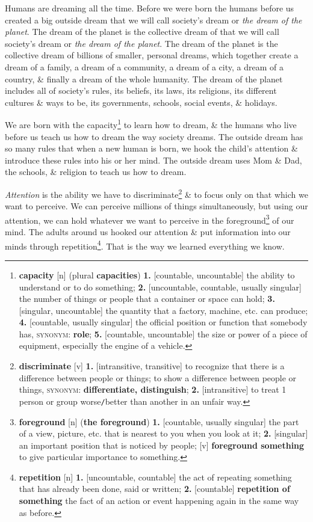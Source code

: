 \documentclass[oneside]{book}
\numberwithin{equation}{section}
\begin{document}
Humans are dreaming all the time. Before we were born the humans before us created a big outside dream that we will call society's dream or \textit{the dream of the planet}. The dream of the planet is the collective dream of that we will call society's dream or \textit{the dream of the planet}. The dream of the planet is the collective dream of billions of smaller, personal dreams, which together create a dream of a family, a dream of a community, a dream of a city, a dream of a country, \& finally a dream of the whole humanity. The dream of the planet includes all of society's rules, its beliefs, its laws, its religions, its different cultures \& ways to be, its governments, schools, social events, \& holidays.

We are born with the capacity\footnote{\textbf{capacity} [n] (plural \textbf{capacities}) \textbf{1.} [countable, uncountable] the ability to understand or to do something; \textbf{2.} [uncountable, countable, usually singular] the number of things or people that a container or space can hold; \textbf{3.} [singular, uncountable] the quantity that a factory, machine, etc. can produce; \textbf{4.} [countable, usually singular] the official position or function that somebody has, \textsc{synonym}: \textbf{role}; \textbf{5.} [countable, uncountable] the size or power of a piece of equipment, especially the engine of a vehicle.} to learn how to dream, \& the humans who live before us teach us how to dream the way society dreams. The outside dream has so many rules that when a new human is born, we hook the child's attention \& introduce these rules into his or her mind. The outside dream uses Mom \& Dad, the schools, \& religion to teach us how to dream.

\textit{Attention} is the ability we have to discriminate\footnote{\textbf{discriminate} [v] \textbf{1.} [intransitive, transitive] to recognize that there is a difference between people or things; to show a difference between people or things, \textsc{synonym}: \textbf{differentiate, distinguish}; \textbf{2.} [intransitive] to treat 1 person or group worse\texttt{/}better than another in an unfair way.} \& to focus only on that which we want to perceive. We can perceive millions of things simultaneously, but using our attention, we can hold whatever we want to perceive in the foreground\footnote{\textbf{foreground} [n] (\textbf{the foreground}) \textbf{1.} [countable, usually singular] the part of a view, picture, etc. that is nearest to you when you look at it; \textbf{2.} [singular] an important position that is noticed by people; [v] \textbf{foreground something} to give particular importance to something.} of our mind. The adults around us hooked our attention \& put information into our minds through repetition\footnote{\textbf{repetition} [n] \textbf{1.} [uncountable, countable] the act of repeating something that has already been done, said or written; \textbf{2.} [countable] \textbf{repetition of something} the fact of an action or event happening again in the same way as before.}. That is the way we learned everything we know.
\end{document}
